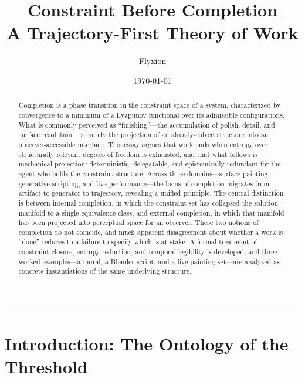 \documentclass[11pt, twoside]{article}
\title{%
  \vspace{-0.5in}
  {\Large Constraint Before Completion}\\[0.4em]
  {\normalsize A Trajectory-First Theory of Work}
}
\author{Flyxion}
\date{\today}
\theoremstyle{plain}
\theoremstyle{definition}
\theoremstyle{remark}
\begin{document}

\maketitle
\thispagestyle{empty}

\vspace{1em}

\begin{abstract}
\noindent
Completion is a phase transition in the constraint space of a system, characterized by convergence to a minimum of a Lyapunov functional over its admissible configurations. What is commonly perceived as ``finishing''---the accumulation of polish, detail, and surface resolution---is merely the projection of an already-solved structure into an observer-accessible interface. This essay argues that work ends when entropy over structurally relevant degrees of freedom is exhausted, and that what follows is mechanical projection: deterministic, delegatable, and epistemically redundant for the agent who holds the constraint structure. Across three domains---surface painting, generative scripting, and live performance---the locus of completion migrates from artifact to generator to trajectory, revealing a unified principle. The central distinction is between internal completion, in which the constraint set has collapsed the solution manifold to a single equivalence class, and external completion, in which that manifold has been projected into perceptual space for an observer. These two notions of completion do not coincide, and much apparent disagreement about whether a work is ``done'' reduces to a failure to specify which is at stake. A formal treatment of constraint closure, entropy reduction, and temporal legibility is developed, and three worked examples---a mural, a Blender script, and a live painting set---are analyzed as concrete instantiations of the same underlying structure.
\end{abstract}

\vspace{1em}
\noindent\rule{\textwidth}{0.4pt}
\vspace{1em}

\tableofcontents
\newpage

\section{Introduction: The Ontology of the Threshold}
\end{document}
